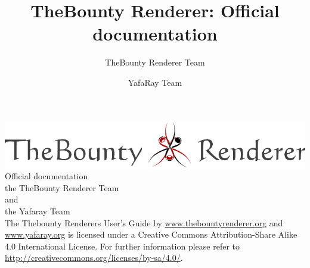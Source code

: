\documentclass[a4paper]{report}
\title{TheBounty Renderer: Official documentation}
\author{TheBounty Renderer Team \and YafaRay Team}
\begin{document}
\begin{titlepage}
    \centering
    \vfill
    {
        \includegraphics[width=.9\textwidth]{images/logo.png} %
        {\Huge Official documentation}\\
        \Large
        \vskip2cm
        the TheBounty Renderer Team\\
        {\large and}
        \\
        the Yafaray Team\\
    }    
    \vfill
    \vfill
    The Thebounty Renderers User's Guide by \url{www.thebountyrenderer.org} and \url{www.yafaray.org} is licensed under a Creative Commons Attribution-Share Alike 4.0 International License. For further information please refer to \url{http://creativecommons.org/licenses/by-sa/4.0/}.
    \begin{flushright}
    \ccbysa
    \end{flushright}
\end{titlepage}
\tableofcontents








\end{document}
